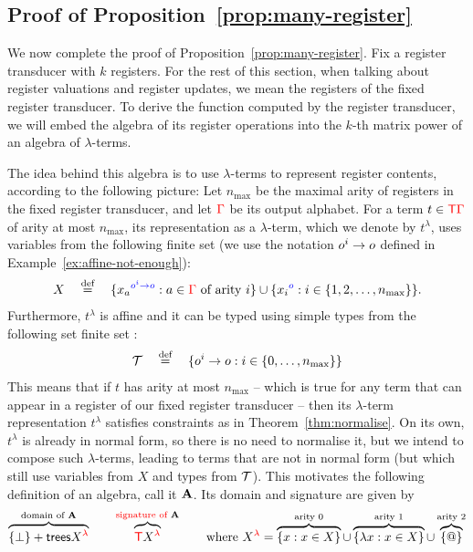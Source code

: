 \newcommand{\nmax}{n_{\mathrm{max}}}
\subsection{Proof of Proposition~\ref{prop:many-register}}
\label{sec:proof-of-prop}
We now complete the proof of Proposition~\ref{prop:many-register}. 
Fix a register transducer with $k$ registers. For the rest of this section, when talking about register valuations and register updates, we mean the registers of the fixed register transducer. To derive the function computed by the register transducer, we will embed the algebra of its register operations into the $k$-th matrix power of an algebra of $\lambda$-terms.  

 The idea behind this algebra is to use  $\lambda$-terms to represent register contents, according to the following picture:
    Let  $\nmax$  be the maximal arity of registers in the fixed register transducer, and let  ${\color{red}{\Gamma}}$ be its  output alphabet. For a term $t \in {\color{red}{\mathsf T}} {\color{red}{\Gamma}}$ of arity at most $\nmax$, its representation as a  $\lambda$-term, which we denote by $t^\lambda$,  uses variables from the following finite set (we use the notation $o^i \to o$ defined in Example~\ref{ex:affine-not-enough}):
\begin{align*}
X  \quad \eqdef \quad \set{\typevar {x_a} {\otype^i \to \otype} : a \in \rGamma \text{ of arity $i$}} \cup \set{\typevar {x_i} \otype : i \in \set{1,2,\ldots,\nmax }}.
\end{align*}
Furthermore, $t^\lambda$ is affine and it can be typed using simple types  from  the following set finite set :
\begin{align*}
    \Tt \quad \eqdef \quad \set{\otype^i \to \otype : i \in \set{0,\ldots,\nmax}}
\end{align*}
This means that if $t$ has arity at most $\nmax$ -- which is true for any term that can appear in a register of our fixed register transducer -- then its $\lambda$-term representation $t^\lambda$ satisfies constraints as in Theorem~\ref{thm:normalise}.  On its own, $t^\lambda$ is already in normal form, so there is no need to normalise it, but we intend to compose  such $\lambda$-terms, leading to terms that are not in normal form (but which still use variables from $X$ and types from ${\mathcal T}$). 
This motivates the  following definition of an algebra, call it ${\color{black}\mathbf A}$. Its domain and signature are given by 
\begin{align*}
\overbrace{\{\bot\} + \mathsf {trees} {X}^{{\color{red}{\lambda}}}}^{{\color{black}\text{domain of }}{\color{black}\mathbf A}}  \qquad \overbrace{ {\color{red}{\mathsf T}} {X}^{{\color{red}{\lambda}}}}^{{\color{red}{\text{signature of }}}{\color{black}\mathbf A}} \qquad \text{where }{X}^{{\color{red}{\lambda}}} = {\overbrace{\{x : x \in X\}}^{\text{arity 0}} \cup \overbrace{\{\lambda x : x \in X\}}^{\text{arity 1}} \cup  \overbrace{\{@\}}^{\text{arity 2}}}
\end{align*}
